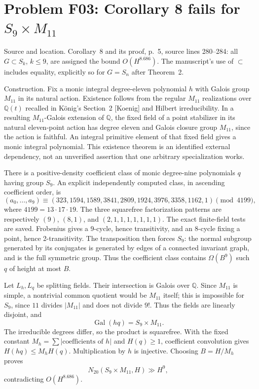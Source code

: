 \documentclass[10pt]{article}
\begin{document}
\section*{Problem F03: Corollary 8 fails for \(S_9\times M_{11}\)}
Source and location. Corollary 8 and its proof, p. 5, source lines 280–284: all \(G\subset S_k\), \(k\le9\), are assigned the bound \(O(H^{8.686})\). The manuscript’s use of \(\subset\) includes equality, explicitly so for \(G=S_n\) after Theorem 2.\par
Construction. Fix a monic integral degree-eleven polynomial \(h\) with Galois group \(M_{11}\) in its natural action. Existence follows from the regular \(M_{11}\) realizations over \(\mathbb Q(t)\) recalled in König’s Section 2 [Koenig] and Hilbert irreducibility. In a resulting \(M_{11}\)-Galois extension of \(\mathbb Q\), the fixed field of a point stabilizer in its natural eleven-point action has degree eleven and Galois closure group \(M_{11}\), since the action is faithful. An integral primitive element of that fixed field gives a monic integral polynomial. This existence theorem is an identified external dependency, not an unverified assertion that one arbitrary specialization works.\par
There is a positive-density coefficient class of monic degree-nine polynomials \(q\) having group \(S_9\). An explicit independently computed class, in ascending coefficient order, is \[(a_0,\ldots,a_9)\equiv
 (323,1594,1589,3841,2809,1924,3976,3358,1162,1)
 \pmod {4199},\] where \(4199=13\cdot17\cdot19\). The three squarefree factorization patterns are respectively \((9)\), \((8,1)\), and \((2,1,1,1,1,1,1,1)\). The exact finite-field tests are saved. Frobenius gives a 9-cycle, hence transitivity, and an 8-cycle fixing a point, hence 2-transitivity. The transposition then forces \(S_9\): the normal subgroup generated by its conjugates is generated by edges of a connected invariant graph, and is the full symmetric group. Thus the coefficient class contains \(\Omega(B^9)\) such \(q\) of height at most \(B\).\par
Let \(L_h,L_q\) be splitting fields. Their intersection is Galois over \(\mathbb Q\). Since \(M_{11}\) is simple, a nontrivial common quotient would be \(M_{11}\) itself; this is impossible for \(S_9\), since \(11\) divides \(|M_{11}|\) and does not divide \(9!\). Thus the fields are linearly disjoint, and \[\operatorname{Gal}(hq)=S_9\times M_{11}.\] The irreducible degrees differ, so the product is squarefree. With the fixed constant \(M_h=\sum|\text{coefficients of }h|\) and \(H(q)\ge1\), coefficient convolution gives \(H(hq)\le M_hH(q)\). Multiplication by \(h\) is injective. Choosing \(B=H/M_h\) proves \[N_{20}(S_9\times M_{11},H)\gg H^9,\] contradicting \(O(H^{8.686})\).\par
\end{document}
